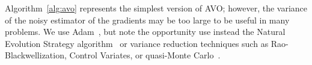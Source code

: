 \documentclass[twocolumn,superscriptaddress,aps]{revtex4-1}
\newcommand{\qxpsi}{q(\mathbf{x}|\bfpsi)}
\newcommand{\bftheta}{{\bm \theta}}
\newcommand{\bfpsi}{{\bm \psi}}
\newcommand{\bfz}{\mathbf{z}}
\theoremstyle{plain}
\begin{document}


Algorithm~\ref{alg:avo} represents the simplest version of AVO; however, the
variance of the noisy estimator of the gradients may be too large to be useful in many problems.
We use Adam~\cite{2014arXiv1412.6980K}, but note the opportunity use instead the Natural Evolution Strategy
algorithm~\citep{2011arXiv1106.4487W} or variance reduction techniques
such as Rao-Blackwellization,
Control Variates, or quasi-Monte Carlo~\citep{ranganath2014black, tran2017variational}.
\end{document}
